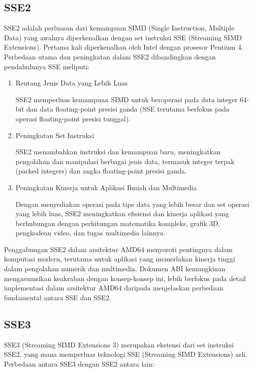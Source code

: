 \subsection{SSE2}
SSE2 adalah perluasan dari kemampuan SIMD (Single Instruction, Multiple Data) yang awalnya diperkenalkan dengan set instruksi SSE (Streaming SIMD Extensions). Pertama kali diperkenalkan oleh Intel dengan prosesor Pentium 4\cite{SystemVAppBinaryInterfaceMichael}. Perbedaan utama dan peningkatan dalam SSE2 dibandingkan dengan pendahulunya SSE meliputi:

\begin{enumerate}
	\item Rentang Jenis Data yang Lebih Luas 
	
	SSE2 memperluas kemampuan SIMD untuk beroperasi pada data integer 64-bit dan data floating-point presisi ganda (SSE terutama berfokus pada operasi floating-point presisi tunggal).
	
	\item Peningkatan Set Instruksi
	
	SSE2 menambahkan instruksi dan kemampuan baru, meningkatkan pengolahan dan manipulasi berbagai jenis data, termasuk integer terpak (packed integers) dan angka floating-point presisi ganda.
	
	\item Peningkatan Kinerja untuk Aplikasi Ilmiah dan Multimedia
	
	Dengan menyediakan operasi pada tipe data yang lebih besar dan set operasi yang lebih luas, SSE2 meningkatkan efisiensi dan kinerja aplikasi yang berhubungan dengan perhitungan matematika kompleks, grafik 3D, pengkodean video, dan tugas multimedia lainnya.
\end{enumerate}

Penggabungan SSE2 dalam arsitektur AMD64 menyoroti pentingnya dalam komputasi modern, terutama untuk aplikasi yang memerlukan kinerja tinggi dalam pengolahan numerik dan multimedia. Dokumen ABI kemungkinan mengasumsikan keakraban dengan konsep-konsep ini, lebih berfokus pada detail implementasi dalam arsitektur AMD64 daripada menjelaskan perbedaan fundamental antara SSE dan SSE2\cite{SystemVAppBinaryInterfaceMichael}.

\subsection{SSE3}
SSE3 (Streaming SIMD Extensions 3) merupakan ekstensi dari set instruksi SSE2, yang mana memperluas teknologi SSE (Streaming SIMD Extensions) asli. Perbedaan antara SSE3 dengan SSE2 antara lain:

